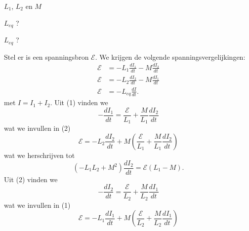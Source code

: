 \begin{description}[labelwidth=1.5cm, leftmargin=!]
    \item[Geg. :] $L_1$, $L_2$ en $M$
    \item[Gevr. :] $L_{eq}$ ? 
    \item[Opl. :]
        \begin{description}[labelwidth=1.5cm, leftmargin=!]
            \item[Gevr. :]  $L_{eq}$ ?
            \item[Opl. :]   
                Stel er is een spanningsbron $\mathcal{E}$. We krijgen de volgende spanningsvergelijkingen: 
                \begin{align}
                    \mathcal{E} 
                        &= - L_1 \frac{dI_1}{dt} - M \frac{dI_2}{dt} \tag{1} \\
                    \mathcal{E} 
                        &= - L_2 \frac{dI_2}{dt} - M \frac{dI_1}{dt} \tag{2} \\
                    \mathcal{E}
                        &= - L_{eq} \frac{dI}{dt}.  \tag{3}
                \end{align}
                met $I = I_1 + I_2$. Uit (1) vinden we
                \begin{equation*}
                    - \frac{dI_1}{dt} = \frac{\mathcal{E}}{L_1} + \frac{M}{L_1}\frac{dI_2}{dt}
                \end{equation*}
                wat we invullen in (2)
                \begin{equation*}
                    \mathcal{E} = - L_2 \frac{dI_2}{dt} + M \left(\frac{\mathcal{E}}{L_1} + \frac{M}{L_1}\frac{dI_2}{dt}\right) 
                \end{equation*}
                wat we herschrijven tot
                \begin{equation}
                    (-L_1L_2 + M^2)\frac{dI_2}{dt} = \mathcal{E}(L_1 - M) \tag{4}.
                \end{equation}
                Uit (2) vinden we
                \begin{equation*}
                    - \frac{dI_2}{dt} = \frac{\mathcal{E}}{L_2} + \frac{M}{L_2}\frac{dI_1}{dt}
                \end{equation*}
                wat we invullen in (1)
                \begin{equation*}
                    \mathcal{E} = - L_1 \frac{dI_1}{dt} + M \left(\frac{\mathcal{E}}{L_2} + \frac{M}{L_2}\frac{dI_1}{dt}\right)
                \end{equation*}

\end{description}
\end{description}

